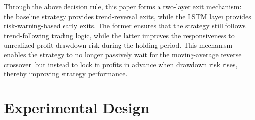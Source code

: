 \documentclass[12pt]{article}
\begin{document}
\begin{table}[htbp]
\centering
\caption{Backtesting Results under Different LSTM Decision Thresholds}
\label{tab:decision_threshold}
\small
\setlength{\tabcolsep}{4pt}
\renewcommand{\arraystretch}{1.15}
\end{table}

Through the above decision rule, this paper forms a two-layer exit mechanism: the baseline 
strategy provides trend-reversal exits, while the LSTM layer provides risk-warning-based early 
exits. The former ensures that the strategy still follows trend-following trading logic, while 
the latter improves the responsiveness to unrealized profit drawdown risk during the holding 
period. This mechanism enables the strategy to no longer passively wait for the moving-average 
reverse crossover, but instead to lock in profits in advance when drawdown risk rises, thereby 
improving strategy performance.

\section{Experimental Design}
\end{document}
